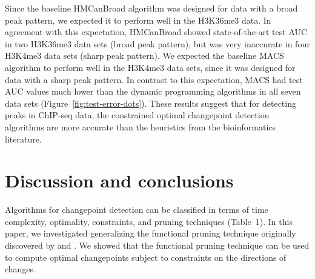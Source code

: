 \documentclass[twoside,11pt]{article}
\begin{document}
Since the baseline HMCanBroad algorithm was designed for data with a
broad peak pattern, we expected it to perform well in the H3K36me3
data. In agreement with this expectation, HMCanBroad showed
state-of-the-art test AUC in two H3K36me3 data sets (broad peak
pattern), but was very inaccurate in four H3K4me3 data sets (sharp
peak pattern). We expected the baseline MACS algorithm to perform well
in the H3K4me3 data sets, since it was designed for data with a sharp
peak pattern. In contrast to this expectation, MACS had test AUC
values much lower than the dynamic programming algorithms in all seven
data sets (Figure~\ref{fig:test-error-dots}). These results suggest
that for detecting peaks in ChIP-seq data, the constrained optimal
changepoint detection algorithms are more accurate than the heuristics
from the bioinformatics literature.


%   

\section{Discussion and conclusions}
\label{sec:discussion}

Algorithms for changepoint detection can be classified in terms of
time complexity, optimality, constraints, and pruning techniques
(Table~1). In this paper, we investigated generalizing the functional
pruning technique originally discovered by \citet{pruned-dp} and
\citet{phd-johnson}. We showed that the functional pruning technique can
be used to compute optimal changepoints subject to constraints
on the directions of changes.
\end{document}
